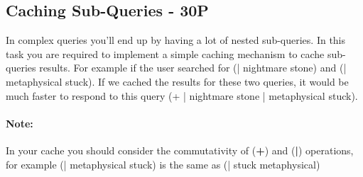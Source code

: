 \documentclass[11pt]{article}
\begin{document}
\subsection{Caching Sub-Queries - 30P}
In complex queries you'll end up by having a lot of nested sub-queries. In this task you are required to implement a simple caching mechanism to cache sub-queries results.  For example if the user searched for ({\color{blue}|} nightmare stone) and ({\color{blue}|} metaphysical stuck). If we cached the results for these two queries, it would be much faster to respond to this query ({\color{blue}+} {\color{blue}|} nightmare stone {\color{blue}|} metaphysical stuck).

\paragraph{Note:} In your cache you should consider the commutativity of (\textbf{+}) and (\textbf{|}) operations, for example ({\color{blue}|} metaphysical stuck) is the same as ({\color{blue}|} stuck metaphysical)
\label{ssec:caching}
\end{document}
